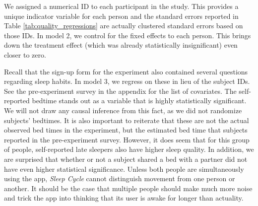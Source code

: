 \documentclass[12pt,]{article}
\begin{document}
We assigned a numerical ID to each participant in the study. This
provides a unique indicator variable for each person and the standard
errors reported in Table \ref{tab:quality_regressions} are actually
clustered standard errors based on those IDs. In model 2, we control for
the fixed effects to each person. This brings down the treatment effect
(which was already statistically insignificant) even closer to zero.

Recall that the sign-up form for the experiment also contained several
questions regarding sleep habits. In model 3, we regress on these in
lieu of the subject IDs. See the pre-experiment survey in the appendix
for the list of covariates. The self-reported bedtime stands out as a
variable that is highly statistically significant. We will not draw any
causal inference from this fact, as we did not randomize subjects'
bedtimes. It is also important to reiterate that these are not the
actual observed bed times in the experiment, but the estimated bed time
that subjects reported in the pre-experiment survey. However, it does
seem that for this group of people, self-reported late sleepers also
have higher sleep quality. In addition, we are surprised that whether or
not a subject shared a bed with a partner did not have even higher
statistical significance. Unless both people are simultaneously using
the app, \emph{Sleep Cycle} cannot distinguish movement from one person
or another. It should be the case that multiple people should make much
more noise and trick the app into thinking that its user is awake for
longer than actuality.
\end{document}
